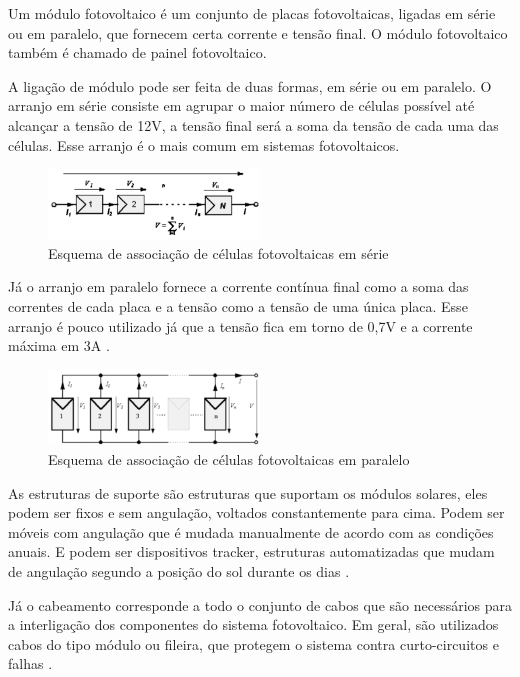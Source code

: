 Um módulo fotovoltaico é um conjunto de placas fotovoltaicas, ligadas em série ou em paralelo, que fornecem certa corrente e tensão final. O módulo fotovoltaico também é chamado de painel fotovoltaico.

A ligação de módulo pode ser feita de duas formas, em série ou em paralelo. O arranjo em série consiste em agrupar o maior número de células possível até alcançar a tensão de 12V, a tensão final será a soma da tensão de cada uma das células. Esse arranjo é o mais comum em sistemas fotovoltaicos.

\begin{figure}[!h]
\centering
\includegraphics[width=0.5\textwidth]{figuras/associacao.png}
\caption{Esquema de associação de células fotovoltaicas em série}
\label{fig:associacao}
\end{figure}

Já o arranjo em paralelo fornece a corrente contínua final como a soma das correntes de cada placa e a tensão como a tensão de uma única placa. Esse arranjo é pouco utilizado já que a tensão fica em torno de 0,7V e a corrente máxima em 3A \cite{da2008projeto}.

\begin{figure}[!h]
\centering
\includegraphics[width=0.5\textwidth]{figuras/associacaoserie.png}
\caption{Esquema de associação de células fotovoltaicas em paralelo}
\label{fig:associacaoparalelo}
\end{figure}

As estruturas de suporte são estruturas que suportam os módulos solares, eles podem ser fixos e sem angulação, voltados constantemente para cima. Podem ser móveis com angulação que é mudada manualmente de acordo com as condições anuais. E podem ser dispositivos tracker, estruturas automatizadas que mudam de angulação segundo a posição do sol durante os dias \cite{ecycleconheca}. 

Já o cabeamento corresponde a todo o conjunto de cabos que são necessários para a interligação dos componentes do sistema fotovoltaico. Em geral, são utilizados cabos do tipo módulo ou fileira, que protegem o sistema contra curto-circuitos e falhas \cite{ecycleconheca}.

